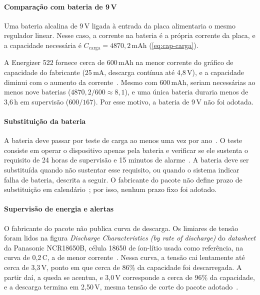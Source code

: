 \paragraph*{Comparação com bateria de 9\,V}

Uma bateria alcalina de 9\,V ligada à entrada da placa alimentaria o
mesmo regulador linear. Nesse caso, a corrente na bateria é a própria
corrente da placa, e a capacidade necessária é $C_{\mathrm{carga}} =
4870{,}2$\,mAh (\autoref{eq:cap-carga}).

A Energizer 522 fornece cerca de 600\,mAh na menor corrente do gráfico de
capacidade do fabricante (25\,mA, descarga contínua até 4,8\,V), e a
capacidade diminui com o aumento da corrente~\cite{energizer522}.
Mesmo com 600\,mAh, seriam necessárias ao menos nove baterias
($4870{,}2/600 \approx 8{,}1$), e uma única bateria duraria menos de
3,6\,h em supervisão ($600/167$). Por esse motivo, a bateria de 9\,V não
foi adotada.

\paragraph*{Substituição da bateria}

A bateria deve passar por teste de carga ao menos uma vez por ano~\cite{reiswig2023nfpa72}. O teste consiste em operar o dispositivo apenas
pela bateria e verificar se ele sustenta o requisito de 24 horas de
supervisão e 15 minutos de alarme~\cite[item~5.3]{cbmmg2017it14}.
A bateria deve ser substituída quando não sustentar esse requisito, ou
quando o sistema indicar falha de bateria, descrita a seguir. O
fabricante do pacote não define prazo de substituição em calendário~\cite{adafruit_5035}; por isso, nenhum prazo fixo foi adotado.

\paragraph*{Supervisão de energia e alertas}

O fabricante do pacote não publica curva de descarga. Os limiares de
tensão foram lidos na figura \textit{Discharge Characteristics (by rate
of discharge)} do \textit{datasheet} da Panasonic NCR18650B, célula 18650
de íon-lítio usada como referência, na curva de 0,2\,C, a de menor
corrente~\cite{panasonic_ncr18650b}.
Nessa curva, a tensão cai lentamente até cerca de 3,3\,V, ponto em que
cerca de 86\% da capacidade foi descarregada. A partir daí, a queda se acentua, e 3,0\,V corresponde a cerca de 96\% da capacidade, e a descarga
termina em 2,50\,V, mesma tensão de corte do pacote adotado~\cite{adafruit_5035}.

